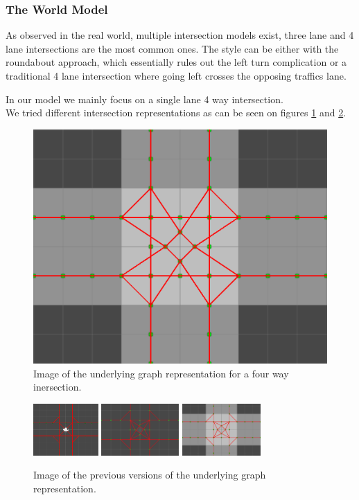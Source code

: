\subsubsection{The World Model}
As observed in the real world, multiple intersection models exist, three lane and 4 lane intersections are the most common ones.
The style can be either with the roundabout approach, which essentially rules out the left turn complication or a traditional 4 lane intersection where going left crosses the opposing traffics lane.

In our model we mainly focus on a single lane 4 way intersection.\\ We tried different intersection representations as can be seen on figures \ref{figure:graph} and \ref{figure:graphs}.

\begin{figure}
\centering
\includegraphics[scale=.4]{img/graph.png}
\caption{Image of the underlying graph representation for a four way inersection.}
\label{figure:graph}
\end{figure}

\begin{figure}
\centering
\includegraphics[height=75px]{img/graph-old1.png}
\includegraphics[height=75px]{img/graph-old2.png}
\includegraphics[height=75px]{img/graph-old3.png}
\caption{Image of the previous versions of the underlying graph representation.}
\label{figure:graphs}
\end{figure}

